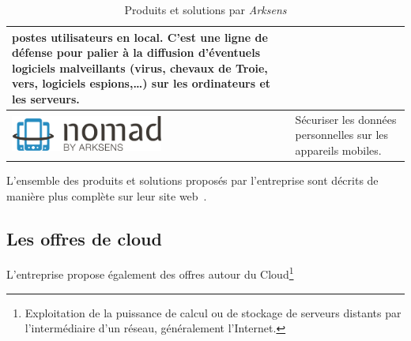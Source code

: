 \documentclass[a4paper,10pt, twoside]{report}
\begin{document}
\begin{spacing}{1.2}
\begin{table}[h!]
\begin{tabular}{m{6cm}m{6cm}}
    postes utilisateurs en local. C'est une ligne de défense pour palier
    à la diffusion d'éventuels logiciels malveillants (virus, chevaux de
    Troie, vers, logiciels espions,\ldots{}) sur les ordinateurs et les
    serveurs.\\
    \hline
    \includegraphics[width=5cm, fbox]{produits/nomad.png} & Sécuriser les
    données personnelles sur les appareils mobiles.\\
    \hline
  \end{tabular}
  \caption{\label{tabProduits} Produits et solutions par \textit{Arksens}}
\end{table}

L'ensemble des produits et solutions proposés par l'entreprise sont décrits
de manière plus complète sur leur site web~\cite{refArksens}.

\subsection{Les offres de cloud}

L'entreprise propose également des offres autour du Cloud\footnote{
Exploitation de la puissance de calcul ou de stockage de serveurs distants
par l'intermédiaire d'un réseau, généralement l'Internet.}


\end{spacing}
\end{document}
